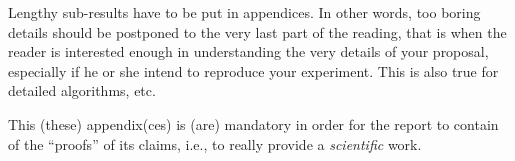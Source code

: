 \label{app:Measures}

Lengthy sub-results have to be put in appendices.  In other words, too boring details should be postponed to the very last part of the reading, that is when the reader is interested enough in understanding the very details of your proposal, especially if he or she intend to reproduce your experiment.  This is also true for detailed algorithms, etc.

This (these) appendix(ces) is (are) mandatory in order for the report to contain of the ``proofs'' of its claims, i.e., to really provide a \emph{scientific} work.